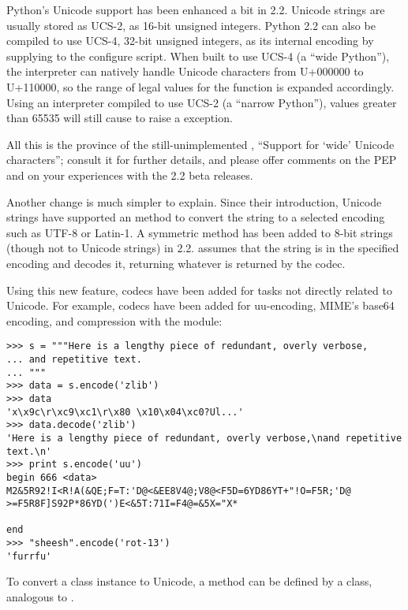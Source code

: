 \documentclass{howto}
\begin{document}
Python's Unicode support has been enhanced a bit in 2.2.  Unicode
strings are usually stored as UCS-2, as 16-bit unsigned integers.
Python 2.2 can also be compiled to use UCS-4, 32-bit unsigned
integers, as its internal encoding by supplying
 to the configure script.  When
built to use UCS-4 (a ``wide Python''), the interpreter can natively
handle Unicode characters from U+000000 to U+110000, so the range of
legal values for the  function is expanded
accordingly.  Using an interpreter compiled to use UCS-2 (a ``narrow
Python''), values greater than 65535 will still cause
 to raise a  exception.

All this is the province of the still-unimplemented , ``Support
for `wide' Unicode characters''; consult it for further details, and
please offer comments on the PEP and on your experiences with the
2.2 beta releases.

Another change is much simpler to explain. Since their introduction,
Unicode strings have supported an  method to convert
the string to a selected encoding such as UTF-8 or Latin-1.  A
symmetric  method has been
added to 8-bit strings (though not to Unicode strings) in 2.2.
 assumes that the string is in the specified encoding
and decodes it, returning whatever is returned by the codec. 

Using this new feature, codecs have been added for tasks not directly
related to Unicode.  For example, codecs have been added for
uu-encoding, MIME's base64 encoding, and compression with the
 module:

\begin{verbatim}
>>> s = """Here is a lengthy piece of redundant, overly verbose,
... and repetitive text.
... """
>>> data = s.encode('zlib')
>>> data
'x\x9c\r\xc9\xc1\r\x80 \x10\x04\xc0?Ul...'
>>> data.decode('zlib')
'Here is a lengthy piece of redundant, overly verbose,\nand repetitive text.\n'
>>> print s.encode('uu')
begin 666 <data>
M2&5R92!I<R!A(&QE;F=T:'D@<&EE8V4@;V8@<F5D=6YD86YT+"!O=F5R;'D@
>=F5R8F]S92P*86YD(')E<&5T:71I=F4@=&5X="X*

end
>>> "sheesh".encode('rot-13')
'furrfu'
\end{verbatim}

To convert a class instance to Unicode, a  method
can be defined by a class, analogous to .
\end{document}
